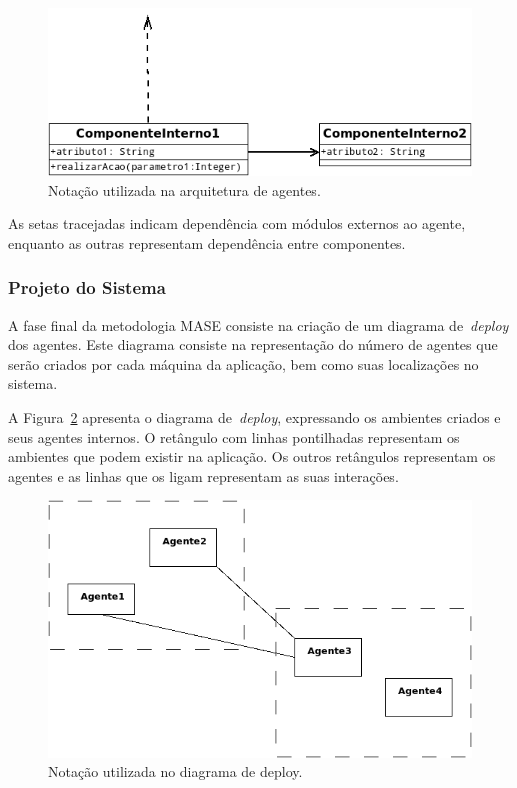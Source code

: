 \begin{figure}
	\centering
	\includegraphics[scale=0.65]{images/exemplo-diagrama-arquitetura-agentes.png}
	\caption{Notação utilizada na arquitetura de agentes.}
	\label{fig:exemplo-diagrama-arquitetura-agentes}
\end{figure}

As setas tracejadas indicam dependência com módulos externos ao agente, enquanto as outras representam dependência entre componentes.

\subsubsection{Projeto do Sistema}

A fase final da metodologia MASE consiste na criação de um diagrama de~\emph{deploy} dos agentes. Este diagrama consiste na representação do número de agentes que serão criados por cada máquina da aplicação, bem como suas localizações no sistema.

A Figura~\ref{fig:exemplo-diagrama-deploy} apresenta o diagrama de~\emph{deploy}, expressando os ambientes criados e seus agentes internos. O retângulo com linhas pontilhadas representam os ambientes que podem existir na aplicação. Os outros retângulos representam os agentes e as linhas que os ligam representam as suas interações.

\begin{figure}
	\centering
	\includegraphics[scale=0.65]{images/exemplo-diagrama-deploy.png}
	\caption{Notação utilizada no diagrama de deploy.}
	\label{fig:exemplo-diagrama-deploy}
\end{figure}

